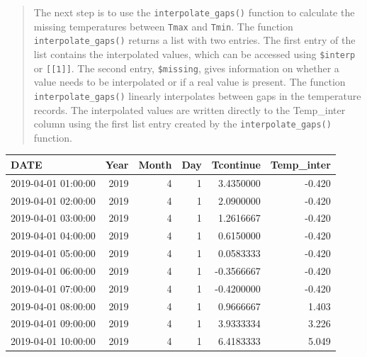 \documentclass[
]{book}
\newenvironment{Shaded}{\begin{snugshade}}{\end{snugshade}}
\newcommand{\CommentTok}[1]{\textcolor[rgb]{0.56,0.35,0.01}{\textit{#1}}}
\newcommand{\DataTypeTok}[1]{\textcolor[rgb]{0.13,0.29,0.53}{#1}}
\newcommand{\DecValTok}[1]{\textcolor[rgb]{0.00,0.00,0.81}{#1}}
\newcommand{\KeywordTok}[1]{\textcolor[rgb]{0.13,0.29,0.53}{\textbf{#1}}}
\newcommand{\NormalTok}[1]{#1}
\newcommand{\OperatorTok}[1]{\textcolor[rgb]{0.81,0.36,0.00}{\textbf{#1}}}
\newcommand{\StringTok}[1]{\textcolor[rgb]{0.31,0.60,0.02}{#1}}
\begin{document}
\begin{quote}
The next step is to use the \texttt{interpolate\_gaps()} function to calculate the missing temperatures between \texttt{Tmax} and \texttt{Tmin}. The function \texttt{interpolate\_gaps()} returns a list with two entries. The first entry of the list contains the interpolated values, which can be accessed using \texttt{\$interp} or \texttt{{[}{[}1{]}{]}}. The second entry, \texttt{\$missing}, gives information on whether a value needs to be interpolated or if a real value is present. The function \texttt{interpolate\_gaps()} linearly interpolates between gaps in the temperature records. The interpolated values are written directly to the Temp\_inter column using the first list entry created by the \texttt{interpolate\_gaps()} function.
\end{quote}

\begin{Shaded}
\end{Shaded}

\begingroup\fontsize{10}{12}\selectfont

\begin{tabular}{l|r|r|r|r|r}
\hline
DATE & Year & Month & Day & Tcontinue & Temp\_inter\\
\hline
2019-04-01 01:00:00 & 2019 & 4 & 1 & 3.4350000 & -0.420\\
\hline
2019-04-01 02:00:00 & 2019 & 4 & 1 & 2.0900000 & -0.420\\
\hline
2019-04-01 03:00:00 & 2019 & 4 & 1 & 1.2616667 & -0.420\\
\hline
2019-04-01 04:00:00 & 2019 & 4 & 1 & 0.6150000 & -0.420\\
\hline
2019-04-01 05:00:00 & 2019 & 4 & 1 & 0.0583333 & -0.420\\
\hline
2019-04-01 06:00:00 & 2019 & 4 & 1 & -0.3566667 & -0.420\\
\hline
2019-04-01 07:00:00 & 2019 & 4 & 1 & -0.4200000 & -0.420\\
\hline
2019-04-01 08:00:00 & 2019 & 4 & 1 & 0.9666667 & 1.403\\
\hline
2019-04-01 09:00:00 & 2019 & 4 & 1 & 3.9333334 & 3.226\\
\hline
2019-04-01 10:00:00 & 2019 & 4 & 1 & 6.4183333 & 5.049\\
\hline
\end{tabular}
\endgroup{}
\end{document}
